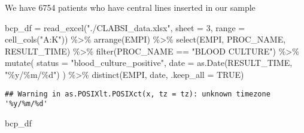 \documentclass[
]{article}
\newenvironment{Shaded}{\begin{snugshade}}{\end{snugshade}}
\newcommand{\AttributeTok}[1]{\textcolor[rgb]{0.77,0.63,0.00}{#1}}
\newcommand{\ConstantTok}[1]{\textcolor[rgb]{0.00,0.00,0.00}{#1}}
\newcommand{\DecValTok}[1]{\textcolor[rgb]{0.00,0.00,0.81}{#1}}
\newcommand{\FunctionTok}[1]{\textcolor[rgb]{0.00,0.00,0.00}{#1}}
\newcommand{\NormalTok}[1]{#1}
\newcommand{\OtherTok}[1]{\textcolor[rgb]{0.56,0.35,0.01}{#1}}
\newcommand{\SpecialCharTok}[1]{\textcolor[rgb]{0.00,0.00,0.00}{#1}}
\newcommand{\StringTok}[1]{\textcolor[rgb]{0.31,0.60,0.02}{#1}}
\begin{document}
\begin{Shaded}
\end{Shaded}

We have 6754 patients who have central lines inserted in our sample

\begin{Shaded}
\begin{Highlighting}[]
\NormalTok{bcp\_df }\OtherTok{=}
  \FunctionTok{read\_excel}\NormalTok{(}\StringTok{"./CLABSI\_data.xlsx"}\NormalTok{, }\AttributeTok{sheet =} \DecValTok{3}\NormalTok{, }\AttributeTok{range =} \FunctionTok{cell\_cols}\NormalTok{(}\StringTok{"A:K"}\NormalTok{)) }\SpecialCharTok{\%\textgreater{}\%} 
  \FunctionTok{arrange}\NormalTok{(EMPI) }\SpecialCharTok{\%\textgreater{}\%} 
  \FunctionTok{select}\NormalTok{(EMPI, PROC\_NAME, RESULT\_TIME) }\SpecialCharTok{\%\textgreater{}\%} 
  \FunctionTok{filter}\NormalTok{(PROC\_NAME }\SpecialCharTok{==} \StringTok{"BLOOD CULTURE"}\NormalTok{) }\SpecialCharTok{\%\textgreater{}\%} 
  \FunctionTok{mutate}\NormalTok{(}
  \AttributeTok{status =} \StringTok{"blood\_culture\_positive"}\NormalTok{,}
  \AttributeTok{date =} \FunctionTok{as.Date}\NormalTok{(RESULT\_TIME, }\StringTok{"\%y/\%m/\%d"}\NormalTok{)}
\NormalTok{)  }\SpecialCharTok{\%\textgreater{}\%} 
  \FunctionTok{distinct}\NormalTok{(EMPI, date, }\AttributeTok{.keep\_all =} \ConstantTok{TRUE}\NormalTok{)}
\end{Highlighting}
\end{Shaded}

\begin{verbatim}
## Warning in as.POSIXlt.POSIXct(x, tz = tz): unknown timezone '%y/%m/%d'
\end{verbatim}

\begin{Shaded}
\begin{Highlighting}[]
\NormalTok{bcp\_df}
\end{Highlighting}
\end{Shaded}
\end{document}
